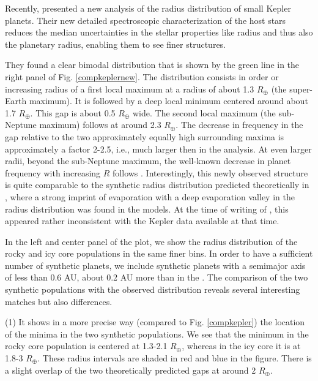 \documentclass[]{emulateapj}
\def\rearth{R_{\oplus}}
\begin{document}
Recently, \citet{Fulton2017} presented a new analysis of the radius distribution of small Kepler planets. Their new detailed spectroscopic characterization of the host stars reduces the median uncertainties in the stellar properties like radius and thus also the planetary radius, enabling them to see finer structures. 

They found a clear bimodal distribution that is shown by the green line in the  right panel of Fig. \ref{compkeplernew}. The distribution consists in order or increasing radius of a first local maximum at a radius of about 1.3 $\rearth$ (the super-Earth maximum). It is followed by a deep local minimum centered around about 1.7 $\rearth$. This gap is about 0.5 $\rearth$ wide. The second local maximum (the sub-Neptune maximum) follows at around 2.3 $\rearth$. The decrease in frequency in the gap relative to the two approximately equally high surrounding maxima is approximately a factor 2-2.5, i.e., much larger then in the \citet{Owen2013} analysis. At even larger radii, beyond the sub-Neptune maximum, the well-known decrease in planet frequency with increasing $R$ follows \citep[e.g.,][]{Borucki2011}. Interestingly, this newly observed structure is quite comparable to the synthetic radius distribution predicted theoretically in \citet[][their Fig. 14]{Jin2014}, where a strong imprint of evaporation with a deep evaporation valley in the radius distribution was found in the models. At the time of writing of  \citet{Jin2014}, this appeared rather inconsistent with the Kepler data available at that time.



In the left and center panel of the plot, we show the radius distribution of the rocky and icy core populations in the same finer bins. In order to have a sufficient number of synthetic planets, we  include synthetic planets with a semimajor axis of less than 0.6 AU, about 0.2 AU more than in the \citet{Fulton2017}. The comparison of the two synthetic populations with the observed distribution reveals several interesting matches but also differences. 

(1) It shows in a more precise way (compared to Fig. \ref{compkepler}) the location of the minima in the two synthetic populations. We see that the minimum in the rocky core population is centered at 1.3-2.1 $R_\oplus$, whereas in the icy core it is  at 1.8-3  $R_\oplus$. These radius intervals are shaded in red and blue in the figure.  There is a slight overlap of the two theoretically predicted gaps at around 2 $R_\oplus$.
\end{document}
